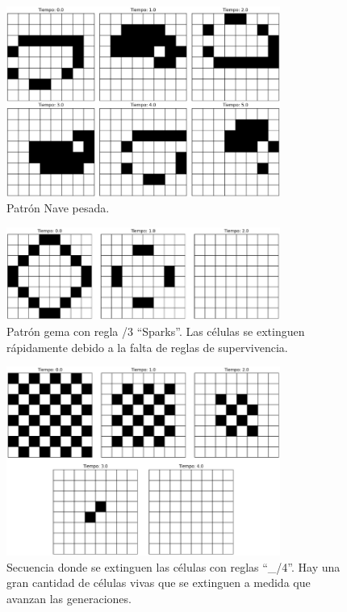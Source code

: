 \documentclass[12pt]{article}
\begin{document}
\begin{figure}
  \centering
  \includegraphics[width=0.8\textwidth]{imagenes/nave4.png}
  \caption{Patrón Nave pesada.\label{img:nave4}}
\end{figure}

\begin{figure}
  \centering
  \includegraphics[width=0.8\textwidth]{imagenes/sparks.png}
  \caption{Patrón gema con regla /3 ``Sparks''. Las células se extinguen rápidamente debido a la falta de reglas de supervivencia.\label{img:sparks}}
\end{figure}

\begin{figure}
  \centering
  \includegraphics[width=0.8\textwidth]{imagenes/sparks2.png}
  \caption{Secuencia donde se extinguen las células con reglas ``\_/4''. Hay una gran cantidad de células vivas que se extinguen a medida que avanzan las generaciones.\label{img:sparks2}}
\end{figure}
\end{document}
